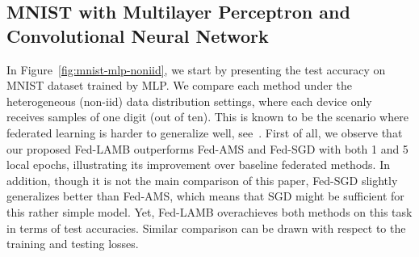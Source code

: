 \documentclass{article}
\begin{document}
\subsection{MNIST with Multilayer Perceptron and Convolutional Neural Network}

In Figure~\ref{fig:mnist-mlp-noniid}, we start by presenting the test accuracy on MNIST dataset trained by MLP. 
We compare each method under the heterogeneous (non-iid) data distribution settings, where each device only receives samples of one digit (out of ten). 
This is known to be the scenario where federated learning is harder to generalize well, see~\citet{mcmahan2017communication}. 
First of all, we observe that our proposed Fed-LAMB outperforms Fed-AMS and Fed-SGD with both 1 and 5 local epochs, illustrating its improvement over baseline federated methods. 
In addition, though it is not the main comparison of this paper, Fed-SGD slightly generalizes better than Fed-AMS, which means that SGD might be sufficient for this rather simple model. 
Yet, Fed-LAMB overachieves both methods on this task in terms of test accuracies.
Similar comparison can be drawn with respect to the training and testing losses.
\end{document}
